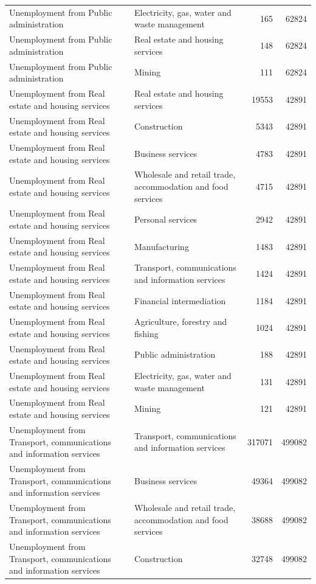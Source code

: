 \begin{longtable}{llrr}
Unemployment from Public administration & Electricity, gas, water and waste management & 165 & 62824 \\
Unemployment from Public administration & Real estate and housing services & 148 & 62824 \\
Unemployment from Public administration & Mining & 111 & 62824 \\
Unemployment from Real estate and housing services & Real estate and housing services & 19553 & 42891 \\
Unemployment from Real estate and housing services & Construction & 5343 & 42891 \\
Unemployment from Real estate and housing services & Business services & 4783 & 42891 \\
Unemployment from Real estate and housing services & Wholesale and retail trade, accommodation and food services & 4715 & 42891 \\
Unemployment from Real estate and housing services & Personal services & 2942 & 42891 \\
Unemployment from Real estate and housing services & Manufacturing & 1483 & 42891 \\
Unemployment from Real estate and housing services & Transport, communications and information services & 1424 & 42891 \\
Unemployment from Real estate and housing services & Financial intermediation & 1184 & 42891 \\
Unemployment from Real estate and housing services & Agriculture, forestry and fishing & 1024 & 42891 \\
Unemployment from Real estate and housing services & Public administration & 188 & 42891 \\
Unemployment from Real estate and housing services & Electricity, gas, water and waste management & 131 & 42891 \\
Unemployment from Real estate and housing services & Mining & 121 & 42891 \\
Unemployment from Transport, communications and information services & Transport, communications and information services & 317071 & 499082 \\
Unemployment from Transport, communications and information services & Business services & 49364 & 499082 \\
Unemployment from Transport, communications and information services & Wholesale and retail trade, accommodation and food services & 38688 & 499082 \\
Unemployment from Transport, communications and information services & Construction & 32748 & 499082 \\

\end{longtable}
